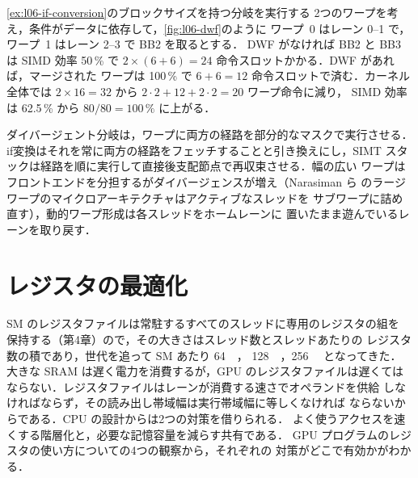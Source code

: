 \documentclass[../main.tex]{subfiles}
\begin{document}
\begin{example}
  \label{ex:l06-dwf}
  \cref{ex:l06-if-conversion}のブロックサイズを持つ分岐を実行する
  2つのワープを考え，条件がデータに依存して，\cref{fig:l06-dwf}のように
  ワープ~0 はレーン 0--1 で，ワープ~1 はレーン 2--3 で BB2 を取るとする．
  DWF がなければ BB2 と BB3 は SIMD 効率 50\,\% で
  $2 \times (6+6) = 24$ 命令スロットかかる．DWF があれば，マージされた
  ワープは 100\,\% で $6+6 = 12$ 命令スロットで済む．カーネル全体では
  $2 \times 16 = 32$ から $2\cdot2 + 12 + 2\cdot2 = 20$ ワープ命令に減り，
  SIMD 効率は 62.5\,\% から $80/80 = 100\,\%$ に上がる．
\end{example}

\begin{keypoint}
  ダイバージェント分岐は，ワープに両方の経路を部分的なマスクで実行させる．
  if変換はそれを常に両方の経路をフェッチすることと引き換えにし，SIMT
  スタックは経路を順に実行して直接後支配節点で再収束させる．幅の広い
  ワープはフロントエンドを分担するがダイバージェンスが増え（Narasiman ら
  のラージワープのマイクロアーキテクチャはアクティブなスレッドを
  サブワープに詰め直す），動的ワープ形成は各スレッドをホームレーンに
  置いたまま遊んでいるレーンを取り戻す．
\end{keypoint}

\section{レジスタの最適化}
\label{sec:l06-registers}

SM のレジスタファイルは常駐するすべてのスレッドに専用のレジスタの組を
保持する（第4章）ので，その大きさはスレッド数とスレッドあたりの
レジスタ数の積であり，世代を追って SM あたり \SI{64}{\kibi\byte}，
\SI{128}{\kibi\byte}，\SI{256}{\kibi\byte} となってきた．
大きな SRAM は遅く電力を消費するが，GPU のレジスタファイルは遅くては
ならない．レジスタファイルはレーンが消費する速さでオペランドを供給
しなければならず，その読み出し帯域幅は実行帯域幅に等しくなければ
ならないからである．CPU の設計からは2つの対策を借りられる．
よく使うアクセスを速くする階層化と，必要な記憶容量を減らす共有である．
GPU プログラムのレジスタの使い方についての4つの観察から，それぞれの
対策がどこで有効かがわかる．
\end{document}
